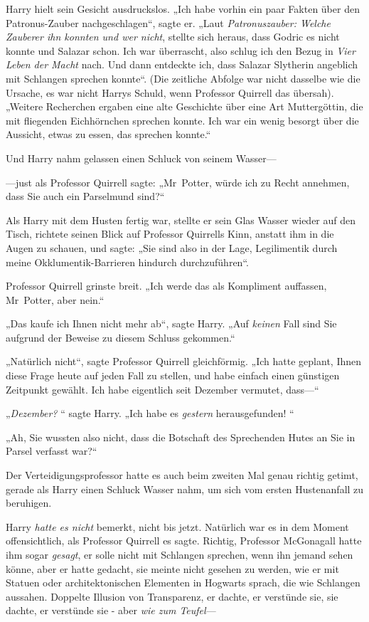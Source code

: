 {Harry hielt sein Gesicht ausdruckslos. „Ich habe vorhin ein paar Fakten über den Patronus-Zauber nachgeschlagen“, sagte er. „Laut \emph{Patronuszauber: Welche Zauberer ihn konnten und wer nicht}, stellte sich heraus, dass Godric es nicht konnte und Salazar schon. Ich war überrascht, also schlug ich den Bezug in \emph{Vier Leben der Macht} nach. Und dann entdeckte ich, dass Salazar Slytherin angeblich mit Schlangen sprechen konnte“. (Die zeitliche Abfolge war nicht dasselbe wie die Ursache, es war nicht Harrys Schuld, wenn Professor Quirrell das übersah). „Weitere Recherchen ergaben eine alte Geschichte über eine Art Muttergöttin, die mit fliegenden Eichhörnchen sprechen konnte. Ich war ein wenig besorgt über die Aussicht, etwas zu essen, das sprechen konnte.“

Und Harry nahm gelassen einen Schluck von seinem Wasser—

—just als Professor Quirrell sagte: „Mr~Potter, würde ich zu Recht annehmen, dass Sie auch ein Parselmund sind?“

Als Harry mit dem Husten fertig war, stellte er sein Glas Wasser wieder auf den Tisch, richtete seinen Blick auf Professor Quirrells Kinn, anstatt ihm in die Augen zu schauen, und sagte: „Sie sind also in der Lage, Legilimentik durch meine Okklumentik-Barrieren hindurch durchzuführen“.

Professor Quirrell grinste breit. „Ich werde das als Kompliment auffassen, Mr~Potter, aber nein.“

„Das kaufe ich Ihnen nicht mehr ab“, sagte Harry. „Auf \emph{keinen} Fall sind Sie aufgrund der Beweise zu diesem Schluss gekommen.“

„Natürlich nicht“, sagte Professor Quirrell gleichförmig. „Ich hatte geplant, Ihnen diese Frage heute auf jeden Fall zu stellen, und habe einfach einen günstigen Zeitpunkt gewählt. Ich habe eigentlich seit Dezember vermutet, dass—“

„\emph{Dezember?} “ sagte Harry. „Ich habe es \emph{gestern} herausgefunden! “

„Ah, Sie wussten also nicht, dass die Botschaft des Sprechenden Hutes an Sie in Parsel verfasst war?“

Der Verteidigungsprofessor hatte es auch beim zweiten Mal genau richtig getimt, gerade als Harry einen Schluck Wasser nahm, um sich vom ersten Hustenanfall zu beruhigen.

Harry \emph{hatte es nicht} bemerkt, nicht bis jetzt. Natürlich war es in dem Moment offensichtlich, als Professor Quirrell es sagte. Richtig, Professor McGonagall hatte ihm sogar \emph{gesagt}, er solle nicht mit Schlangen sprechen, wenn ihn jemand sehen könne, aber er hatte gedacht, sie meinte nicht gesehen zu werden, wie er mit Statuen oder architektonischen Elementen in Hogwarts sprach, die wie Schlangen aussahen. Doppelte Illusion von Transparenz, er dachte, er verstünde sie, sie dachte, er verstünde sie - aber \emph{wie zum Teufel}—

}
